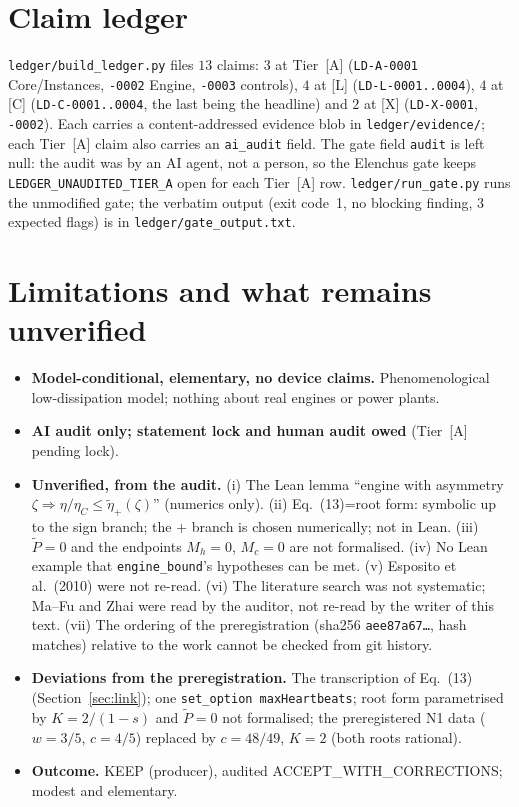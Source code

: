 \documentclass[10pt]{article}
\newcommand{\tier}[1]{\textsf{[#1]}}
\newcommand{\tA}{\tier{A}}
\newcommand{\tL}{\tier{L}}
\newcommand{\tC}{\tier{C}}
\newcommand{\tX}{\tier{X}}
\newcommand{\lean}[1]{\texttt{#1}}
\newcommand{\eC}{\eta_C}
\newcommand{\ep}{\tilde\eta_+}
\theoremstyle{plain}
\begin{document}
\section{Claim ledger}\label{sec:ledger}
\texttt{ledger/build\_ledger.py} files $13$ claims: $3$ at Tier~\tA{} (\texttt{LD-A-0001} Core/Instances, \texttt{-0002} Engine, \texttt{-0003} controls), $4$ at \tL{} (\texttt{LD-L-0001..0004}), $4$ at \tC{} (\texttt{LD-C-0001..0004}, the last being the headline) and $2$ at \tX{} (\texttt{LD-X-0001}, \texttt{-0002}). Each carries a content-addressed evidence blob in \texttt{ledger/evidence/}; each Tier~\tA{} claim also carries an \texttt{ai\_audit} field. The gate field \texttt{audit} is left null: the audit was by an AI agent, not a person, so the Elenchus gate keeps \texttt{LEDGER\_UNAUDITED\_TIER\_A} open for each Tier~\tA{} row. \texttt{ledger/run\_gate.py} runs the unmodified gate; the verbatim output (exit code~1, no blocking finding, $3$ expected flags) is in \texttt{ledger/gate\_output.txt}.

\section{Limitations and what remains unverified}\label{sec:lim}
\begin{itemize}\itemsep=1pt
\item \textbf{Model-conditional, elementary, no device claims.} Phenomenological low-dissipation model; nothing about real engines or power plants.
\item \textbf{AI audit only; statement lock and human audit owed} (Tier~\tA{} pending lock).
\item \textbf{Unverified, from the audit.} (i) The Lean lemma ``engine with asymmetry $\zeta\Rightarrow\eta/\eC\le\ep(\zeta)$'' (numerics only). (ii) Eq.~(13)=root form: symbolic up to the sign branch; the $+$ branch is chosen numerically; not in Lean. (iii) $\tilde P=0$ and the endpoints $M_h=0$, $M_c=0$ are not formalised. (iv) No Lean example that \lean{engine\_bound}'s hypotheses can be met. (v) Esposito et al.\ (2010) were not re-read. (vi) The literature search was not systematic; Ma--Fu and Zhai were read by the auditor, not re-read by the writer of this text. (vii) The ordering of the preregistration (sha256 \texttt{aee87a67\dots}, hash matches) relative to the work cannot be checked from git history.
\item \textbf{Deviations from the preregistration.} The transcription of Eq.~(13) (Section~\ref{sec:link}); one \lean{set\_option maxHeartbeats}; root form parametrised by $K=2/(1-s)$ and $\tilde P=0$ not formalised; the preregistered N1 data ($w=3/5$, $c=4/5$) replaced by $c=48/49$, $K=2$ (both roots rational).
\item \textbf{Outcome.} KEEP (producer), audited ACCEPT\_WITH\_CORRECTIONS; modest and elementary.
\end{itemize}
\end{document}
